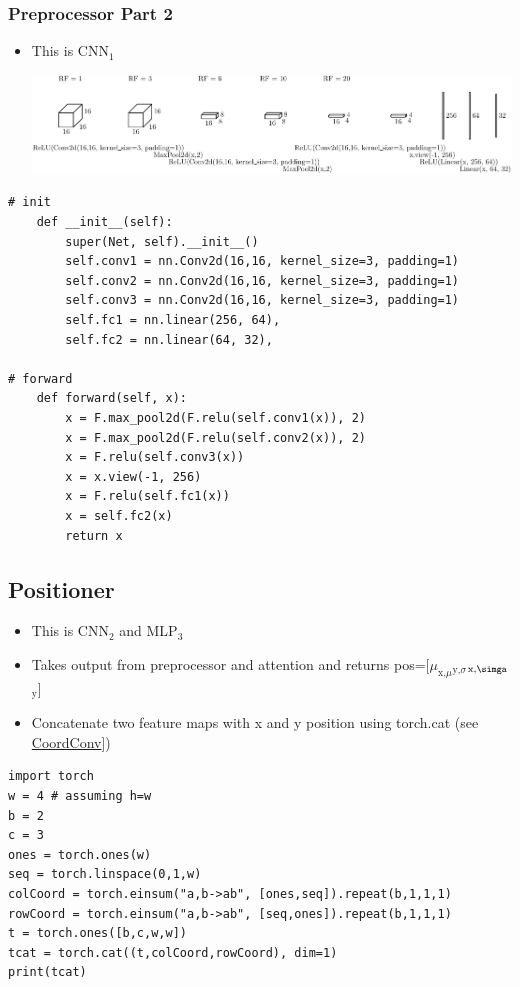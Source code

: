 \documentclass[11pt]{article}
\begin{document}
\subsubsection{Preprocessor Part 2}
\label{sec:org8928489}
\begin{itemize}
\item This is CNN\(_{\text{1}}\)
\begin{center}
\includegraphics[width=.9\linewidth]{./figures/preprocessor2.pdf}
\end{center}
\end{itemize}
\begin{verbatim}
# init
	def __init__(self):
		super(Net, self).__init__()
		self.conv1 = nn.Conv2d(16,16, kernel_size=3, padding=1)
		self.conv2 = nn.Conv2d(16,16, kernel_size=3, padding=1)
		self.conv3 = nn.Conv2d(16,16, kernel_size=3, padding=1)
		self.fc1 = nn.linear(256, 64),
		self.fc2 = nn.linear(64, 32),

# forward
	def forward(self, x):
		x = F.max_pool2d(F.relu(self.conv1(x)), 2)
		x = F.max_pool2d(F.relu(self.conv2(x)), 2)
		x = F.relu(self.conv3(x))
		x = x.view(-1, 256)
		x = F.relu(self.fc1(x))
		x = self.fc2(x)
		return x

\end{verbatim}

\subsection{Positioner}
\label{sec:orge13452d}
\begin{itemize}
\item This is CNN\(_{\text{2}}\) and MLP\(_{\text{3}}\)
\item Takes output from preprocessor and attention and returns 
pos=[\(\mu_{\text{x,}\mu}\)\(_{\text{y,}\sigma}\)\(_{\text{x,}\simga}\)\(_{\text{y}}\)]
\end{itemize}
\begin{itemize}
\item Concatenate two feature maps with x and y position using
torch.cat (see  \href{https://eng.uber.com/coordconv/}{CoordConv}])
\end{itemize}

\begin{verbatim}
import torch
w = 4 # assuming h=w
b = 2
c = 3
ones = torch.ones(w)
seq = torch.linspace(0,1,w)
colCoord = torch.einsum("a,b->ab", [ones,seq]).repeat(b,1,1,1)
rowCoord = torch.einsum("a,b->ab", [seq,ones]).repeat(b,1,1,1)
t = torch.ones([b,c,w,w])
tcat = torch.cat((t,colCoord,rowCoord), dim=1)
print(tcat)
\end{verbatim}
\end{document}
